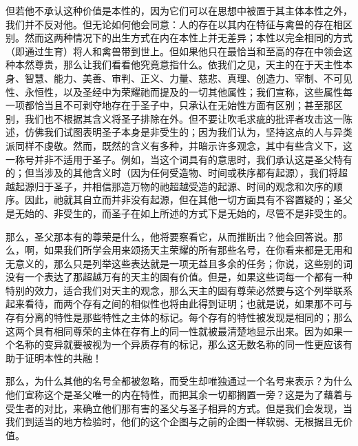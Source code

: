 但若他不承认这种价值是本性的，因为它们可以在思想中被置于其主体本性之外，我们并不反对他。但无论如何他会同意：人的存在以其内在特征与禽兽的存在相区别。然而这两种情况下的出生方式在内在本性上并无差异；本性以完全相同的方式（即通过生育）将人和禽兽带到世上。但如果他只在最恰当和至高的存在中领会这种本然尊贵，那么让我们看看他究竟意指什么。依我们之见，天主的在于天主性本身、智慧、能力、美善、审判、正义、力量、慈悲、真理、创造力、宰制、不可见性、永恒性，以及圣经中为荣耀祂而提及的一切其他属性；我们宣称，这些属性每一项都恰当且不可剥夺地存在于圣子中，只承认在无始性方面有区别；甚至那区别，我们也不根据其含义将圣子排除在外。但不要让吹毛求疵的批评者攻击这一陈述，仿佛我们试图表明圣子本身是非受生的；因为我们认为，坚持这点的人与异类派同样不虔敬。然而，既然的含义有多种，并暗示许多观念，其中有些含义下，这一称号并非不适用于圣子。例如，当这个词具有的意思时，我们承认这是圣父特有的；但当涉及的其他含义时（因为任何受造物、时间或秩序都有起源），我们将超越起源归于圣子，并相信那造万物的祂超越受造的起源、时间的观念和次序的顺序。因此，祂就其自立而并非没有起源，但在其他一切方面具有不容置疑的；圣父是无始的、非受生的，而圣子在如上所述的方式下是无始的，尽管不是非受生的。\par

那么，圣父那本有的尊荣是什么，他将要察看它，从而推断出？他会回答说。那么，啊，如果我们所学会用来颂扬天主荣耀的所有那些名号，在你看来都是无用和无意义的，那么只是列举这些表达就是一项无益且多余的任务；你说，这些别的词没有一个表达了那超越万有的天主的固有价值。但是，如果这些词每一个都有一种特别的效力，适合我们对天主的观念，那么天主的固有尊荣必然要与这个列举联系起来看待，而两个存有之间的相似性也将由此得到证明；也就是说，如果那不可与存有分离的特性是那些特性之主体的标记。每个存有的特性被发现是相同的；那么这两个具有相同尊荣的主体在存有上的同一性就被最清楚地显示出来。因为如果一个名称的变异就要被视为一个异质存有的标记，那么这无数名称的同一性更应该有助于证明本性的共融！\par

那么，为什么其他的名号全都被忽略，而受生却唯独通过一个名号来表示？为什么他们宣称这个是圣父唯一的内在特性，而把其余一切都搁置一旁？这是为了藉着与受生者的对比，来确立他们那有害的圣父与圣子相异的方式。但是我们会发现，当我们到适当的地方检验时，他们的这个企图与之前的企图一样软弱、无根据且无价值。\par


